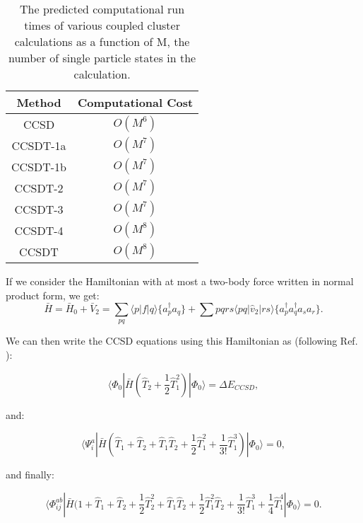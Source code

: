     \begin{table}[H]
        \centering
        \begin{tabular}{|c|c|} \hline
             Method &  Computational Cost \\ \hline
             CCSD & $O(M^6)$ \\ \hline 
             CCSDT-1a & $O(M^7)$ \\ \hline 
             CCSDT-1b & $O(M^7)$ \\ \hline 
             CCSDT-2 & $O(M^7)$ \\ \hline
             CCSDT-3& $O(M^7)$ \\ \hline 
             CCSDT-4 & $O(M^8)$ \\ \hline 
             CCSDT & $O(M^8)$ \\ \hline 
        \end{tabular}
        \caption{The predicted computational run times of various coupled cluster calculations as a function of M, the number of single particle states in the calculation.}
        \label{tab:ccsdtn_runtimes}
    \end{table}


    If we consider the Hamiltonian with at most a two-body force written in normal product form, we get:
    \begin{equation}
        \bar{H} = \bar{H}_0 + \bar{V}_2 = \sum_{pq}\langle p | f | q \rangle \{a^\dagger_pa_q\} + \sum{pqrs} \langle pq | \hat{v}_2 | rs \rangle \{a^\dagger_pa^\dagger_qa_sa_r\}.
    \end{equation}

    We can then write the CCSD equations using this Hamiltonian as (following Ref. \cite{Ref155}):

    \begin{equation} \label{ccsd_e}
        \langle \Phi_0 | \bar{H}(\hat{T}_2 + \frac{1}{2}\hat{T}_1^2) | \Phi_0 \rangle = \Delta E_{CCSD},
    \end{equation}

    and:

    \begin{equation} \label{ccsd_amp_single}
        \langle \Psi_i^a | \bar{H}(\hat{T}_1 + \hat{T}_2 + \hat{T}_1\hat{T}_2 + \frac{1}{2}\hat{T}_1^2 + \frac{1}{3!}\hat{T}_1^3)|\Phi_0 \rangle = 0,
    \end{equation}

    and finally:

    \begin{equation} \label{ccsd_amp_double}
        \langle \Phi_{ij}^{ab} | \bar{H}(1 + \hat{T}_1 + \hat{T}_2 + \frac{1}{2}\hat{T}_2^2 + \hat{T}_1\hat{T}_2 + \frac{1}{2}\hat{T}_1^2\hat{T}_2 + \frac{1}{3!}\hat{T}_1^3 + \frac{1}{4}\hat{T}_1^4|\Phi_0\rangle = 0.
    \end{equation}

